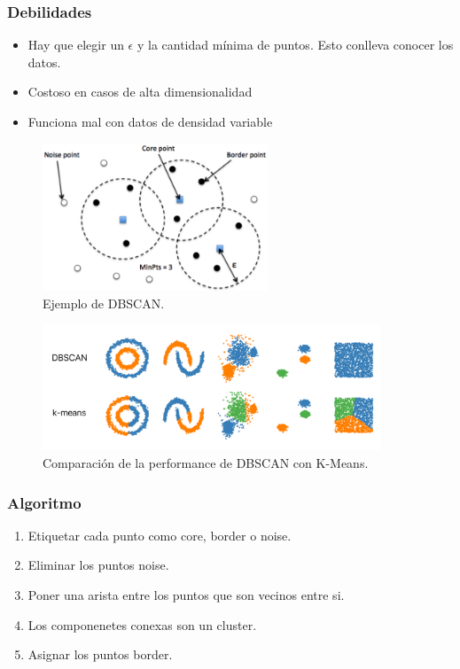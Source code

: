 \documentclass[titlepage,a4paper]{article}
\begin{document}
\subsubsection*{Debilidades}
\begin{itemize}
    \item Hay que elegir un $\epsilon$ y la cantidad mínima de puntos. Esto conlleva conocer los datos.
    \item Costoso en casos de alta dimensionalidad
    \item Funciona mal con datos de densidad variable
\end{itemize}

\begin{figure}[!htb]
    \centering
    \includegraphics[width=0.6\textwidth]{imagenesResumen/DBSCAN.png}
    \caption{Ejemplo de DBSCAN.}
\end{figure}

\begin{figure}[!htb]
    \centering
    \includegraphics[width=0.9\textwidth]{imagenesResumen/ComparacionKMeansDBSCAN.png}
    \caption{Comparación de la performance de DBSCAN con K-Means.}
\end{figure}

\subsubsection*{Algoritmo}
\begin{enumerate}
    \item Etiquetar cada punto como core, border o noise.
    \item Eliminar los puntos noise.
    \item Poner una arista entre los puntos que son vecinos entre si.
    \item Los componenetes conexas son un cluster.
    \item Asignar los puntos border.
\end{enumerate}
\end{document}
